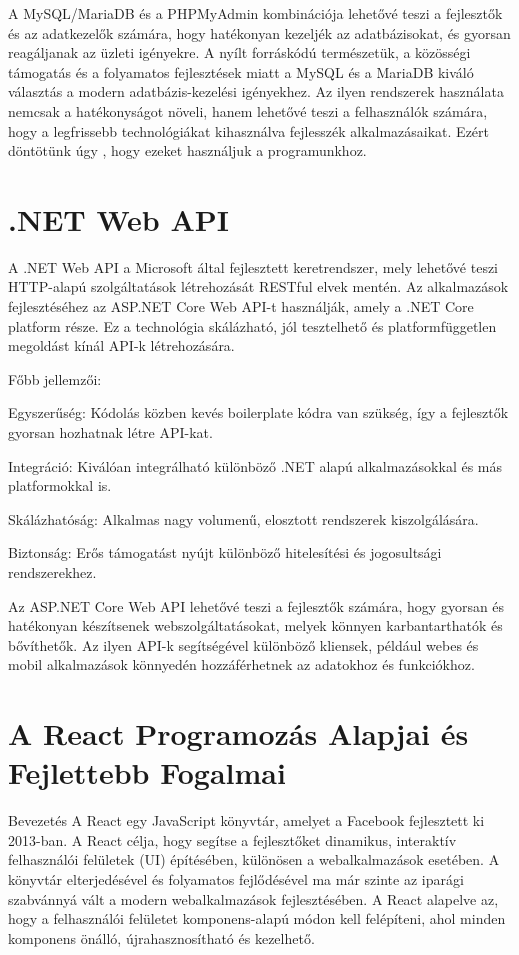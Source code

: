 \documentclass[colorlinks]{thesis-kando}
\theoremstyle{definition}
\theoremstyle{remark}
\begin{document}
A MySQL/MariaDB és a PHPMyAdmin kombinációja lehetővé teszi a fejlesztők és az adatkezelők számára, hogy hatékonyan kezeljék az adatbázisokat, és gyorsan reagáljanak az üzleti igényekre. A nyílt forráskódú természetük, a közösségi támogatás és a folyamatos fejlesztések miatt a MySQL és a MariaDB kiváló választás a modern adatbázis-kezelési igényekhez. Az ilyen rendszerek használata nemcsak a hatékonyságot növeli, hanem lehetővé teszi a felhasználók számára, hogy a legfrissebb technológiákat kihasználva fejlesszék alkalmazásaikat. Ezért döntötünk úgy , hogy ezeket használjuk a programunkhoz.

\section{.NET Web API}

A .NET Web API a Microsoft által fejlesztett keretrendszer, mely lehetővé teszi HTTP-alapú szolgáltatások létrehozását RESTful elvek mentén. Az alkalmazások fejlesztéséhez az ASP.NET Core Web API-t használják, amely a .NET Core platform része. Ez a technológia skálázható, jól tesztelhető és platformfüggetlen megoldást kínál API-k létrehozására.
\cite{net1}

Főbb jellemzői:

Egyszerűség: Kódolás közben kevés boilerplate kódra van szükség, így a fejlesztők gyorsan hozhatnak létre API-kat.

Integráció: Kiválóan integrálható különböző .NET alapú alkalmazásokkal és más platformokkal is.

Skálázhatóság: Alkalmas nagy volumenű, elosztott rendszerek kiszolgálására.

Biztonság: Erős támogatást nyújt különböző hitelesítési és jogosultsági rendszerekhez.

Az ASP.NET Core Web API lehetővé teszi a fejlesztők számára, hogy gyorsan és hatékonyan készítsenek webszolgáltatásokat, melyek könnyen karbantarthatók és bővíthetők. Az ilyen API-k segítségével különböző kliensek, például webes és mobil alkalmazások könnyedén hozzáférhetnek az adatokhoz és funkciókhoz.

\section{A React Programozás Alapjai és Fejlettebb Fogalmai}

Bevezetés
A React egy JavaScript könyvtár, amelyet a Facebook fejlesztett ki 2013-ban. A React célja, hogy segítse a fejlesztőket dinamikus, interaktív felhasználói felületek (UI) építésében, különösen a webalkalmazások esetében. A könyvtár elterjedésével és folyamatos fejlődésével ma már szinte az iparági szabvánnyá vált a modern webalkalmazások fejlesztésében. A React alapelve az, hogy a felhasználói felületet komponens-alapú módon kell felépíteni, ahol minden komponens önálló, újrahasznosítható és kezelhető.
\cite{react1}
\end{document}
